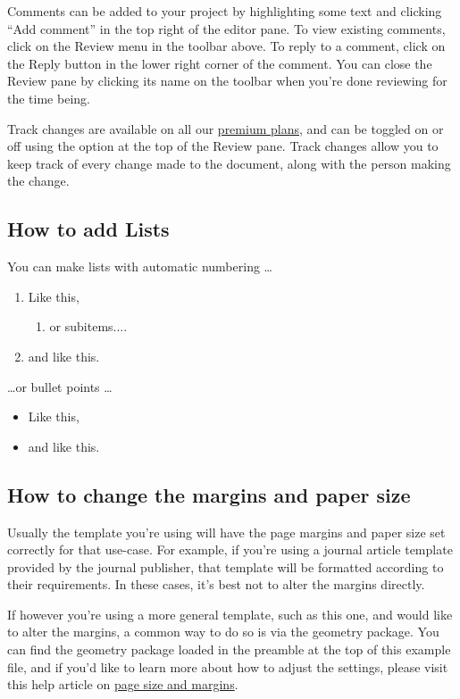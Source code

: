 \documentclass{article}
\begin{document}
Comments can be added to your project by highlighting some text and clicking ``Add comment'' in the top right of the editor pane. To view existing comments, click on the Review menu in the toolbar above. To reply to a comment, click on the Reply button in the lower right corner of the comment. You can close the Review pane by clicking its name on the toolbar when you're done reviewing for the time being.

Track changes are available on all our \href{https://www.overleaf.com/user/subscription/plans}{premium plans}, and can be toggled on or off using the option at the top of the Review pane. Track changes allow you to keep track of every change made to the document, along with the person making the change. 

\subsection{How to add Lists}

You can make lists with automatic numbering \dots

\begin{enumerate}
\item Like this,
\begin{enumerate}
    \item or subitems....
\end{enumerate}
\item and like this.
\end{enumerate}
\dots or bullet points \dots
\begin{itemize}
\item Like this,

\item and like this.
\end{itemize}






\subsection{How to change the margins and paper size}

Usually the template you're using will have the page margins and paper size set correctly for that use-case. For example, if you're using a journal article template provided by the journal publisher, that template will be formatted according to their requirements. In these cases, it's best not to alter the margins directly.

If however you're using a more general template, such as this one, and would like to alter the margins, a common way to do so is via the geometry package. You can find the geometry package loaded in the preamble at the top of this example file, and if you'd like to learn more about how to adjust the settings, please visit this help article on \href{https://www.overleaf.com/learn/latex/page_size_and_margins}{page size and margins}.
\end{document}
